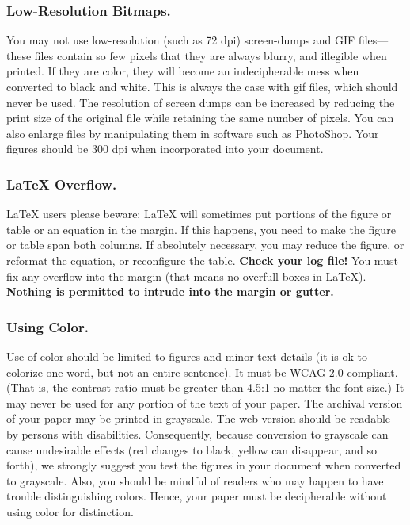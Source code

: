 \subsubsection{Low-Resolution Bitmaps.}
You may not use low-resolution (such as 72 dpi) screen-dumps and GIF files---these files contain so few pixels that they are always blurry, and illegible when printed. If they are color, they will become an indecipherable mess when converted to black and white. This is always the case with gif files, which should never be used. The resolution of screen dumps can be increased by reducing the print size of the original file while retaining the same number of pixels. You can also enlarge files by manipulating them in software such as PhotoShop. Your figures should be 300 dpi when incorporated into your document.

\subsubsection{\LaTeX{} Overflow.}
\LaTeX{} users please beware: \LaTeX{} will sometimes put portions of the figure or table or an equation in the margin. If this happens, you need to make the figure or table span both columns. If absolutely necessary, you may reduce the figure, or reformat the equation, or reconfigure the table.{ \bf Check your log file!} You must fix any overflow into the margin (that means no overfull boxes in \LaTeX{}). \textbf{Nothing is permitted to intrude into the margin or gutter.}


\subsubsection{Using Color.}
Use of color should be limited to figures and minor text details (it is ok to colorize one word, but not an entire sentence). It must be WCAG 2.0 compliant. (That is, the contrast ratio must be greater than 4.5:1 no matter the font size.) It may never be used for any portion of the text of your paper. The archival version of your paper may be printed in grayscale. The web version should be readable by persons with disabilities. Consequently, because conversion to grayscale can cause undesirable effects (red changes to black, yellow can disappear, and so forth), we strongly suggest you test the figures in your document when converted to grayscale. Also, you should be mindful of readers who may happen to have trouble distinguishing colors. Hence, your paper must be decipherable without using color for distinction.

